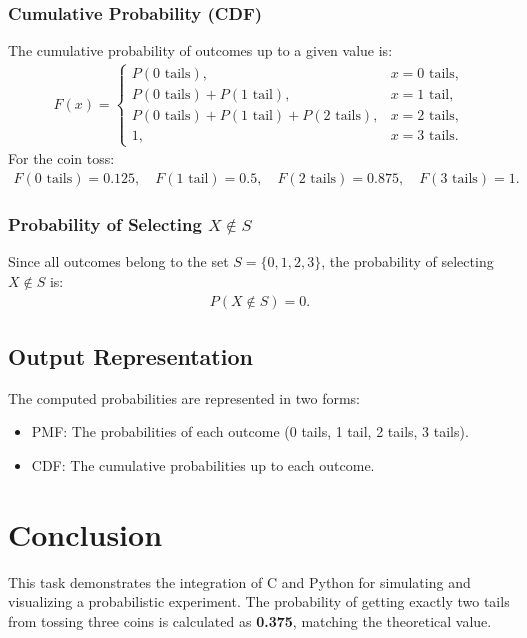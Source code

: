 \documentclass[journal]{IEEEtran}
\begin{document}
\subsubsection*{Cumulative Probability (CDF)}
The cumulative probability of outcomes up to a given value is:
\begin{align}
F(x) = 
\begin{cases} 
P(0 \text{ tails}), & x = 0 \text{ tails}, \\
P(0 \text{ tails}) + P(1 \text{ tail}), & x = 1 \text{ tail}, \\
P(0 \text{ tails}) + P(1 \text{ tail}) + P(2 \text{ tails}), & x = 2 \text{ tails}, \\
1, & x = 3 \text{ tails}.
\end{cases}
\end{align}
For the coin toss:
\begin{align}
F(0 \text{ tails}) = 0.125, \quad F(1 \text{ tail}) = 0.5, \quad F(2 \text{ tails}) = 0.875, \quad F(3 \text{ tails}) = 1.
\end{align}

\subsubsection*{Probability of Selecting \( X \notin S \)}
Since all outcomes belong to the set \( S = \{0, 1, 2, 3\}\), the probability of selecting \( X \notin S \) is:
\begin{align}
P(X \notin S) = 0.
\end{align}

\subsection*{Output Representation}
The computed probabilities are represented in two forms:
\begin{itemize}
    \item PMF: The probabilities of each outcome (0 tails, 1 tail, 2 tails, 3 tails).
    \item CDF: The cumulative probabilities up to each outcome.
\end{itemize}

\section*{Conclusion}
This task demonstrates the integration of C and Python for simulating and visualizing a probabilistic experiment. The probability of getting exactly two tails from tossing three coins is calculated as \textbf{0.375}, matching the theoretical value.
\end{document}
